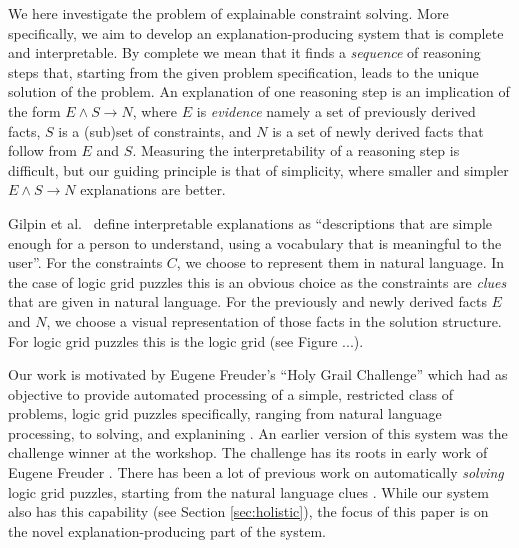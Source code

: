 We here investigate the problem of explainable constraint solving. More specifically, we aim to develop an explanation-producing system that is complete and interpretable. By complete we mean that it finds a \textit{sequence} of reasoning steps that, starting from the given problem specification, leads to the unique solution of the problem. An explanation of one reasoning step is an implication of the form $E \wedge S \rightarrow N$, where $E$ is \textit{evidence} namely a set of previously derived facts, $S$ is a (sub)set of constraints, and $N$ is a set of newly derived facts that follow from $E$ and $S$. Measuring the interpretability of a reasoning step is difficult, but our guiding principle is that of simplicity, where smaller and simpler $E \wedge S \rightarrow N$ explanations are better. 


Gilpin et al.~\cite{DBLP:conf/dsaa/GilpinBYBSK18} define interpretable explanations as ``descriptions that are simple enough for a person to understand, using a vocabulary that is meaningful to the user''. For the constraints $C$, we choose to represent them in natural language. In the case of logic grid puzzles this is an obvious choice as the constraints are \textit{clues} that are given in natural language. For the previously and newly derived facts $E$ and $N$, we choose a visual representation of those facts in the solution structure. For logic grid puzzles this is the logic grid (see Figure ...).

Our work is motivated by Eugene Freuder's ``Holy Grail Challenge'' which had as objective  to provide automated processing of a simple, restricted class of problems, logic grid puzzles specifically, ranging from natural language processing, to solving, and explanining \cite{}. 
An earlier version of this system was the challenge winner at the workshop. The challenge has its roots in early work of Eugene Freuder \cite{DBLP:conf/aaai/SabinF96,DBLP:conf/aaai/SqalliF96}.
There has been a lot of previous work on automatically \emph{solving} logic grid puzzles, starting from the natural language clues \cite{related,work}. 
While our system also has this capability (see Section \ref{sec:holistic}), the focus of this paper is on the novel explanation-producing part of the system.


